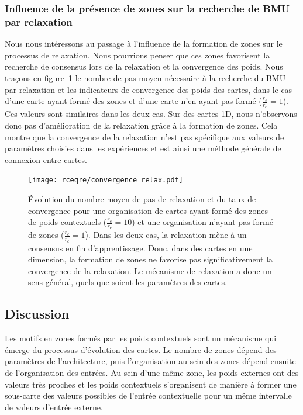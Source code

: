 \documentclass[../main]{subfiles}
\begin{document}
\subsubsection{Influence de la présence de zones sur la recherche de BMU par relaxation}

Nous nous intéressons au passage à l'influence de la formation de zones sur le processus de relaxation.
Nous pourrions penser que ces zones favorisent la recherche de consensus lors de la relaxation et la convergence des poids.
Nous traçons en figure~\ref{fig:conv_rcre} le nombre de pas moyen nécessaire à la recherche du BMU par relaxation et les indicateurs de convergence des poids des cartes, dans le cas d'une carte ayant formé des zones et d'une carte n'en ayant pas formé ($\frac{r_e}{r_c} = 1$). 
Ces valeurs sont similaires dans les deux cas.
Sur des cartes 1D, nous n'observons donc pas d'amélioration de la relaxation grâce à la formation de zones.
Cela montre que la convergence de la relaxation n'est pas spécifique aux valeurs de paramètres choisies dans les expériences et est ainsi une méthode générale de connexion entre cartes.

\begin{figure}[hb]
	\centering\texttt{[image: rceqre/convergence\_relax.pdf]}
	\caption{\'Evolution du nombre moyen de pas de relaxation et du taux de convergence pour une organisation de cartes ayant formé des zones de poids contextuels ($\frac{r_e}{r_c} = 10$) et une organisation n'ayant pas formé de zones ($\frac{r_e}{r_c} = 1$). Dans les deux cas, la relaxation mène à un consensus en fin d'apprentissage.
	Donc, dans des cartes en une dimension, la formation de zones ne favorise pas significativement la convergence de la relaxation. Le mécanisme de relaxation a donc un sens général, quels que soient les paramètres des cartes. \label{fig:conv_rcre}}
\end{figure}

\subsection{Discussion}

Les motifs en zones formés par les poids contextuels sont un mécanisme qui émerge du processus d'évolution des cartes.
Le nombre de zones dépend des paramètres de l'architecture, puis l'organisation au sein des zones dépend ensuite de l'organisation des entrées. 
Au sein d'une même zone, les poids externes ont des valeurs très proches et les poids contextuels s'organisent de manière à former une sous-carte des valeurs possibles de l'entrée contextuelle pour un même intervalle de valeurs d'entrée externe.
\end{document}
